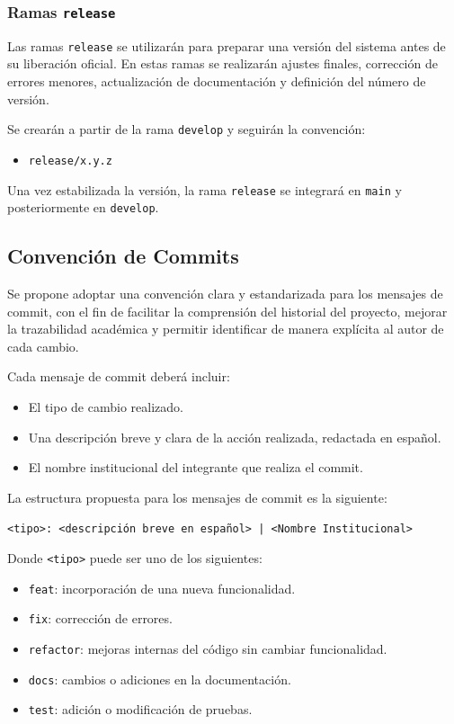 \documentclass[12pt]{article}
\begin{document}
\subsubsection{Ramas \texttt{release}}

Las ramas \texttt{release} se utilizarán para preparar una versión del sistema antes de su liberación oficial. En estas ramas se realizarán ajustes finales, corrección de errores menores, actualización de documentación y definición del número de versión.

Se crearán a partir de la rama \texttt{develop} y seguirán la convención:
\begin{itemize}
    \item \texttt{release/x.y.z}
\end{itemize}

Una vez estabilizada la versión, la rama \texttt{release} se integrará en \texttt{main} y posteriormente en \texttt{develop}.

\subsection{Convención de Commits}

Se propone adoptar una convención clara y estandarizada para los mensajes de commit, con el fin de facilitar la comprensión del historial del proyecto, mejorar la trazabilidad académica y permitir identificar de manera explícita al autor de cada cambio.

Cada mensaje de commit deberá incluir:
\begin{itemize}
    \item El tipo de cambio realizado.
    \item Una descripción breve y clara de la acción realizada, redactada en español.
    \item El nombre institucional del integrante que realiza el commit.
\end{itemize}

La estructura propuesta para los mensajes de commit es la siguiente:

\begin{center}
\texttt{<tipo>: <descripción breve en español> | <Nombre Institucional>}
\end{center}

Donde \texttt{<tipo>} puede ser uno de los siguientes:

\begin{itemize}
    \item \texttt{feat}: incorporación de una nueva funcionalidad.
    \item \texttt{fix}: corrección de errores.
    \item \texttt{refactor}: mejoras internas del código sin cambiar funcionalidad.
    \item \texttt{docs}: cambios o adiciones en la documentación.
    \item \texttt{test}: adición o modificación de pruebas.
\end{itemize}
\end{document}
